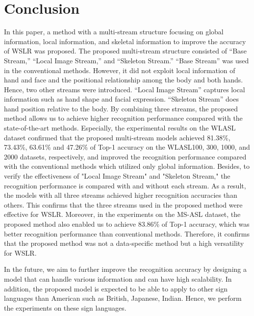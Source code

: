 \documentclass[journal]{IEEEtran}
\begin{document}
\section{Conclusion}\label{conclusion}
In this paper, a method with a multi-stream structure focusing on global information, local information, and skeletal information to improve the accuracy of WSLR was proposed. The proposed multi-stream structure consisted of ``Base Stream,'' ``Local Image Stream,'' and ``Skeleton Stream.'' ``Base Stream'' was used in the conventional methods. However, it did not exploit local information of hand and face and the positional relationship among the body and both hands. Hence, two other streams were introduced. ``Local Image Stream'' captures local information such as hand shape and facial expression. ``Skeleton Stream'' does hand position relative to the body. 
By combining three streams, the proposed method allows us to achieve higher recognition performance compared with the state-of-the-art methods. Especially, the experimental results on the WLASL dataset confirmed that the proposed multi-stream models achieved 81.38\%, 73.43\%, 63.61\% and 47.26\% of Top-1 accuracy on the WLASL100, 300, 1000, and 2000 datasets, respectively, and improved the recognition performance compared with the conventional methods which utilized only global information. Besides, to verify the effectiveness of "Local Image Stream" and "Skeleton Stream," the recognition performance is compared with and without each stream. As a result, the models with all three streams achieved higher recognition accuracies than others. This confirms that the three streams used in the proposed method were effective for WSLR.  Moreover, in the experiments on the MS-ASL dataset, the proposed method also enabled us to achieve 83.86\% of Top-1 accuracy, which was better recognition performance than conventional methods. Therefore, it confirms that the proposed method was not a data-specific method but a high versatility for WSLR.

In the future, we aim to further improve the recognition accuracy by designing a model that can handle various information and can have high scalability. In addition, the proposed model is expected to be able to apply to other sign languages than American such as British, Japanese, Indian. Hence, we perform the experiments on these sign languages.
\end{document}
